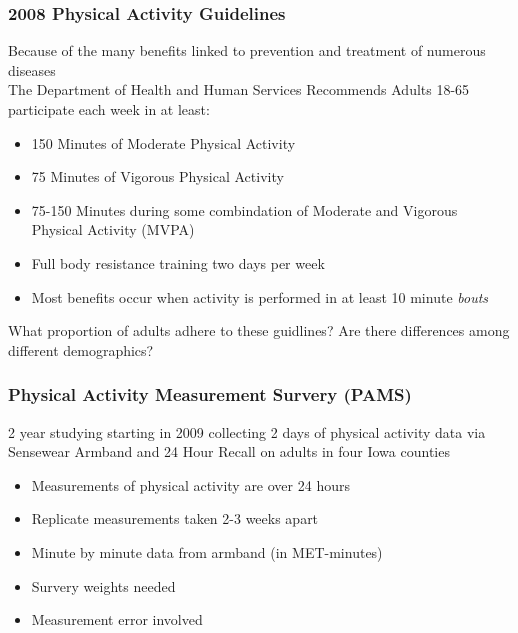 \documentclass[handout]{beamer}\usepackage[]{graphicx}\usepackage[]{color}
\begin{document}
\begin{frame}
\frametitle{2008 Physical Activity Guidelines}
Because of the many benefits linked to prevention and treatment of numerous diseases \\%

The Department of Health and Human Services Recommends Adults 18-65 participate each week in at least:

\begin{itemize}
\item
150 Minutes of Moderate Physical Activity 
\item
75 Minutes of Vigorous Physical Activity
\item
75-150 Minutes during some combindation of Moderate and Vigorous Physical Activity (MVPA)
\item
Full body resistance training two days per week
\item
Most benefits occur when activity is performed in at least 10 minute \emph{bouts}
\end{itemize}

\vspace{0.3cm}

What proportion of adults adhere to these guidlines? Are there differences among different demographics?

\end{frame}


\begin{frame}
\frametitle{Physical Activity Measurement Survery (PAMS)}
2 year studying starting in 2009 collecting 2 days of physical activity data via Sensewear Armband and 24 Hour Recall on adults in four Iowa counties

\begin{itemize}
\item
Measurements of physical activity are over 24 hours
\item
Replicate measurements taken 2-3 weeks apart
\item
Minute by minute data from armband (in MET-minutes)
\item
Survery weights needed 
\item
Measurement error involved
\end{itemize}

\end{frame}
\end{document}

